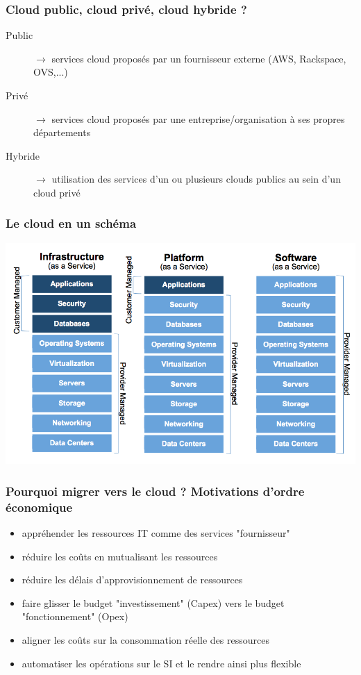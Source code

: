  \begin{frame}
    \frametitle{Cloud public, cloud privé, cloud hybride ?}
    \begin{description}
      \item[Public] $\rightarrow$ services cloud proposés par un fournisseur externe (AWS, Rackspace, OVS,...)\pause
      \item[Privé] $\rightarrow$ services cloud proposés par une entreprise/organisation à ses propres départements\pause 
      \item[Hybride] $\rightarrow$ utilisation des services d'un ou plusieurs clouds publics au sein d'un cloud privé
    \end{description}
  \end{frame}

  \begin{frame}
    \frametitle{Le cloud en un schéma}
    \includegraphics[width=\linewidth,height=\textheight]{images/cloud.png}
  \end{frame}

  \begin{frame}
    \frametitle{Pourquoi migrer vers le cloud ? Motivations d'ordre économique}
    \begin{itemize}
      \item appréhender les ressources IT comme des services "fournisseur"\pause
      \item réduire les coûts en mutualisant les ressources\pause
      \item réduire les délais d'approvisionnement de ressources\pause
      \item faire glisser le budget "investissement" (Capex) vers le budget "fonctionnement" (Opex)\pause
      \item aligner les coûts sur la consommation réelle des ressources\pause
      \item automatiser les opérations sur le SI et le rendre ainsi plus flexible
    \end{itemize}
  \end{frame}

